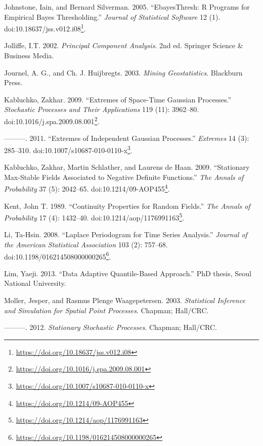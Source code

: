 \documentclass[b5paper,]{book}
\let\rmarkdownfootnote\footnote%
\def\footnote{\protect\rmarkdownfootnote}
\renewcommand{\href}[2]{#2\footnote{\url{#1}}}
\theoremstyle{definition}
\theoremstyle{definition}
\theoremstyle{definition}
\theoremstyle{remark}
\begin{document}
\hypertarget{ref-Johnstone2005}{}
Johnstone, Iain, and Bernard Silverman. 2005. ``EbayesThresh: R Programs
for Empirical Bayes Thresholding.'' \emph{Journal of Statistical
Software} 12 (1).
doi:\href{https://doi.org/10.18637/jss.v012.i08}{10.18637/jss.v012.i08}.

\hypertarget{ref-Jolliffe2002}{}
Jolliffe, I.T. 2002. \emph{Principal Component Analysis}. 2nd ed.
Springer Science \& Business Media.

\hypertarget{ref-Journel2003}{}
Journel, A. G., and Ch. J. Huijbregts. 2003. \emph{Mining
Geostatistics}. Blackburn Press.

\hypertarget{ref-Kabluchko2009b}{}
Kabluchko, Zakhar. 2009. ``Extremes of Space-Time Gaussian Processes.''
\emph{Stochastic Processes and Their Applications} 119 (11): 3962--80.
doi:\href{https://doi.org/10.1016/j.spa.2009.08.001}{10.1016/j.spa.2009.08.001}.

\hypertarget{ref-Kabluchko2011}{}
---------. 2011. ``Extremes of Independent Gaussian Processes.''
\emph{Extremes} 14 (3): 285--310.
doi:\href{https://doi.org/10.1007/s10687-010-0110-x}{10.1007/s10687-010-0110-x}.

\hypertarget{ref-Kabluchko2009a}{}
Kabluchko, Zakhar, Martin Schlather, and Laurens de Haan. 2009.
``Stationary Max-Stable Fields Associated to Negative Definite
Functions.'' \emph{The Annals of Probability} 37 (5): 2042--65.
doi:\href{https://doi.org/10.1214/09-AOP455}{10.1214/09-AOP455}.

\hypertarget{ref-Kent1989}{}
Kent, John T. 1989. ``Continuity Properties for Random Fields.''
\emph{The Annals of Probability} 17 (4): 1432--40.
doi:\href{https://doi.org/10.1214/aop/1176991163}{10.1214/aop/1176991163}.

\hypertarget{ref-Li2008}{}
Li, Ta-Hsin. 2008. ``Laplace Periodogram for Time Series Analysis.''
\emph{Journal of the American Statistical Association} 103 (2): 757--68.
doi:\href{https://doi.org/10.1198/016214508000000265}{10.1198/016214508000000265}.

\hypertarget{ref-Lim2013}{}
Lim, Yaeji. 2013. ``Data Adaptive Quantile-Based Approach.'' PhD thesis,
Seoul National University.

\hypertarget{ref-Moller2003}{}
Moller, Jesper, and Rasmus Plenge Waagepetersen. 2003. \emph{Statistical
Inference and Simulation for Spatial Point Processes}. Chapman;
Hall/CRC.

\hypertarget{ref-Lindgren2012}{}
---------. 2012. \emph{Stationary Stochastic Processes}. Chapman;
Hall/CRC.
\end{document}
